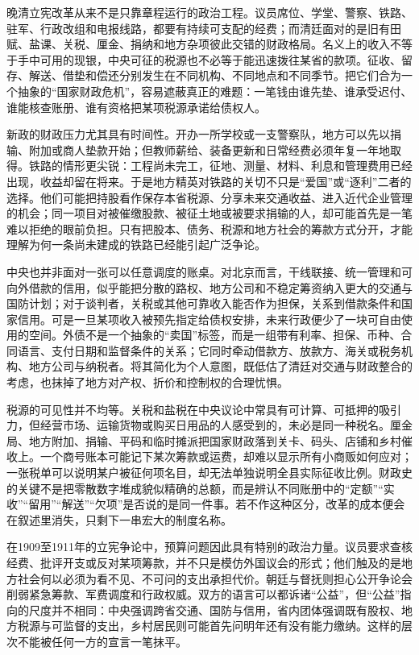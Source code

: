 晚清立宪改革从来不是只靠章程运行的政治工程。议员席位、学堂、警察、铁路、驻军、行政改组和电报线路，都要有持续可支配的经费；而清廷面对的是旧有田赋、盐课、关税、厘金、捐纳和地方杂项彼此交错的财政格局。名义上的收入不等于手中可用的现银，中央可征的税源也不必等于能迅速拨往某省的款项。征收、留存、解送、借垫和偿还分别发生在不同机构、不同地点和不同季节。把它们合为一个抽象的“国家财政危机”，容易遮蔽真正的难题：一笔钱由谁先垫、谁承受迟付、谁能核查账册、谁有资格把某项税源承诺给债权人。

新政的财政压力尤其具有时间性。开办一所学校或一支警察队，地方可以先以捐输、附加或商人垫款开始；但教师薪给、装备更新和日常经费必须年复一年地取得。铁路的情形更尖锐：工程尚未完工，征地、测量、材料、利息和管理费用已经出现，收益却留在将来。于是地方精英对铁路的关切不只是“爱国”或“逐利”二者的选择。他们可能把持股看作保存本省税源、分享未来交通收益、进入近代企业管理的机会；同一项目对被催缴股款、被征土地或被要求捐输的人，却可能首先是一笔难以拒绝的眼前负担。只有把股本、债务、税源和地方社会的筹款方式分开，才能理解为何一条尚未建成的铁路已经能引起广泛争论。

中央也并非面对一张可以任意调度的账桌。对北京而言，干线联接、统一管理和可向外借款的信用，似乎能把分散的路权、地方公司和不稳定筹资纳入更大的交通与国防计划；对于谈判者，关税或其他可靠收入能否作为担保，关系到借款条件和国家信用。可是一旦某项收入被预先指定给债权安排，未来行政便少了一块可自由使用的空间。外债不是一个抽象的“卖国”标签，而是一组带有利率、担保、币种、合同语言、支付日期和监督条件的关系；它同时牵动借款方、放款方、海关或税务机构、地方公司与纳税者。将其简化为个人意图，既低估了清廷对交通与财政整合的考虑，也抹掉了地方对产权、折价和控制权的合理忧惧。

税源的可见性并不均等。关税和盐税在中央议论中常具有可计算、可抵押的吸引力，但经营市场、运输货物或购买日用品的人感受到的，未必是同一种税名。厘金局、地方附加、捐输、平码和临时摊派把国家财政落到关卡、码头、店铺和乡村催收上。一个商号账本可能记下某次筹款或运费，却难以显示所有小商贩如何应对；一张税单可以说明某户被征何项名目，却无法单独说明全县实际征收比例。财政史的关键不是把零散数字堆成貌似精确的总额，而是辨认不同账册中的“定额”“实收”“留用”“解送”“欠项”是否说的是同一件事。若不作这种区分，改革的成本便会在叙述里消失，只剩下一串宏大的制度名称。

在1909至1911年的立宪争论中，预算问题因此具有特别的政治力量。议员要求查核经费、批评开支或反对某项筹款，并不只是模仿外国议会的形式；他们触及的是地方社会何以必须为看不见、不可问的支出承担代价。朝廷与督抚则担心公开争论会削弱紧急筹款、军费调度和行政权威。双方的语言可以都诉诸“公益”，但“公益”指向的尺度并不相同：中央强调跨省交通、国防与信用，省内团体强调既有股权、地方税源与可监督的支出，乡村居民则可能首先问明年还有没有能力缴纳。这样的层次不能被任何一方的宣言一笔抹平。

